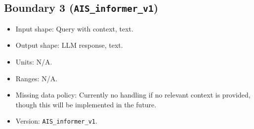 \documentclass[11pt]{article}
\begin{document}
\subsection{Boundary 3 (\texttt{AIS\_informer\_v1})}
\begin{itemize}
  \item Input shape: Query with context, text.
  \item Output shape: LLM response, text.
  \item Units: N/A.
  \item Ranges: N/A.
  \item Missing data policy: Currently no handling if no relevant context is provided, though this will be implemented in the future.
  \item Version: \texttt{AIS\_informer\_v1}.
\end{itemize}
\end{document}

